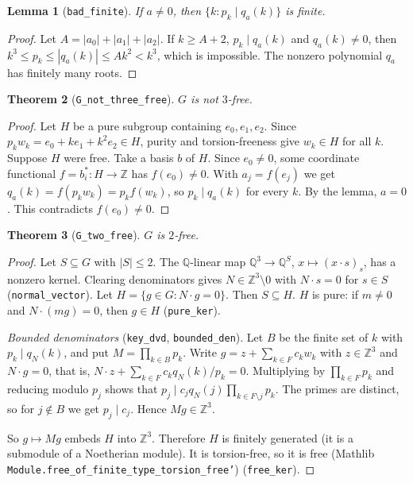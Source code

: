 \documentclass[11pt]{article}
\newtheorem{theorem}{Theorem}
\newtheorem{lemma}[theorem]{Lemma}
\theoremstyle{definition}
\begin{document}
\begin{lemma}[\texttt{bad\_finite}]
If $a\ne0$, then $\{k: p_k\mid q_a(k)\}$ is finite.
\end{lemma}
\begin{proof}
Let $A=|a_0|+|a_1|+|a_2|$. If $k\ge A+2$, $p_k\mid q_a(k)$ and $q_a(k)\ne0$, then
$k^3\le p_k\le|q_a(k)|\le Ak^2<k^3$, which is impossible. The nonzero polynomial $q_a$ has finitely many
roots.
\end{proof}

\begin{theorem}[\texttt{G\_not\_three\_free}]
$G$ is not $3$-free.
\end{theorem}
\begin{proof}
Let $H$ be a pure subgroup containing $e_0,e_1,e_2$. Since $p_kw_k=e_0+ke_1+k^2e_2\in H$, purity and
torsion-freeness give $w_k\in H$ for all $k$. Suppose $H$ were free. Take a basis $b$ of $H$. Since
$e_0\ne0$, some coordinate functional $f=b^*_i\colon H\to\mathbb Z$ has $f(e_0)\ne0$. With
$a_j=f(e_j)$ we get $q_a(k)=f(p_kw_k)=p_kf(w_k)$, so $p_k\mid q_a(k)$ for every $k$. By the lemma,
$a=0$. This contradicts $f(e_0)\ne0$.
\end{proof}

\begin{theorem}[\texttt{G\_two\_free}]
$G$ is $2$-free.
\end{theorem}
\begin{proof}
Let $S\subseteq G$ with $|S|\le2$. The $\mathbb Q$-linear map $\mathbb Q^3\to\mathbb Q^S$,
$x\mapsto(x\cdot s)_s$, has a nonzero kernel. Clearing denominators gives $N\in\mathbb Z^3\setminus0$
with $N\cdot s=0$ for $s\in S$ (\texttt{normal\_vector}). Let $H=\{g\in G:N\cdot g=0\}$. Then $S\subseteq
H$. $H$ is pure: if $m\ne0$ and $N\cdot(mg)=0$, then $g\in H$ (\texttt{pure\_ker}).

\emph{Bounded denominators} (\texttt{key\_dvd}, \texttt{bounded\_den}). Let $B$ be the finite set of
$k$ with $p_k\mid q_N(k)$, and put $M=\prod_{k\in B}p_k$. Write $g=z+\sum_{k\in F}c_kw_k$ with
$z\in\mathbb Z^3$ and $N\cdot g=0$, that is, $N\cdot z+\sum_{k\in F}c_kq_N(k)/p_k=0$. Multiplying by
$\prod_{k\in F}p_k$ and reducing modulo $p_j$ shows that $p_j\mid c_jq_N(j)\prod_{k\in F\setminus j}p_k$.
The primes are distinct, so for $j\notin B$ we get $p_j\mid c_j$. Hence $Mg\in\mathbb Z^3$.

So $g\mapsto Mg$ embeds $H$ into $\mathbb Z^3$. Therefore $H$ is finitely generated (it is a submodule
of a Noetherian module). It is torsion-free, so it is free (Mathlib
\texttt{Module.free\_of\_finite\_type\_torsion\_free'}) (\texttt{free\_ker}).
\end{proof}
\end{document}
